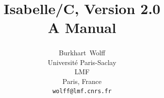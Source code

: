 \documentclass[abstract=on,fontsize=10pt,a4paper,mpinclude=true,
oneside,
pagesize,DIV=14]{scrartcl}
\title{Isabelle/C, Version 2.0\\[.3em]\large A Manual}
\author{
Burkhart~Wolff\textsuperscript{\orcidlink{0000-0002-9648-7663}}\\\small
Universit\'e Paris-Saclay\\
LMF\\
Paris, France\\
\texttt{wolff@lmf.cnrs.fr}
}
\date{}
\begin{document}
\renewcommand{\sectionautorefname}{Section}
\renewcommand{\subsectionautorefname}{Section}
\renewcommand{\subsubsectionautorefname}{Section}

\maketitle



\printbibliography
\end{document}
